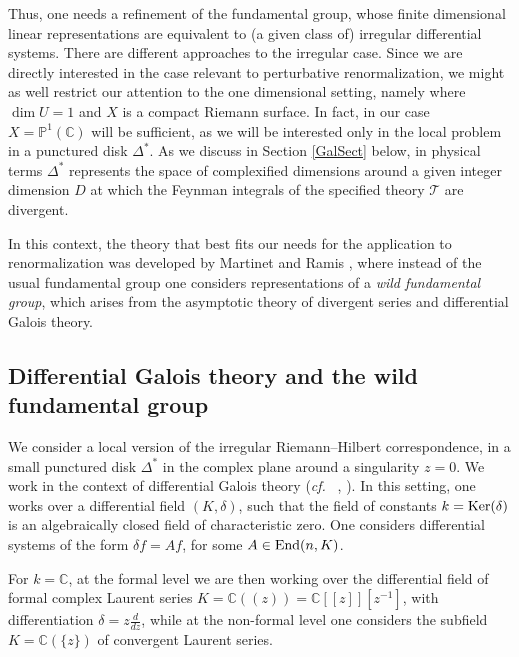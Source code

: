 \documentclass[10pt]{amsart}
\def\C{{\mathbb C}}
\renewcommand{\P}{{\mathbb P}}
\def\sT{{\mathcal T}}
\def\Ker{\mathop{\rm Ker}\nolimits}
\newcommand{\cf}{{\it cf.\/}\ }
\numberwithin{equation}{section}
\begin{document}
\smallskip

Thus, one needs a refinement of the fundamental group, whose
finite dimensional linear representations are equivalent to (a given
class of) irregular differential systems. There are different
approaches to the irregular case. Since we are directly interested in
the case relevant to perturbative renormalization, we might as well
restrict our attention to the one dimensional setting, namely where
$\dim U=1$ and $X$ is a compact Riemann surface. In fact, in our case
$X=\P^1(\C)$ will be sufficient, as we will be interested only in the
local problem in a punctured disk $\Delta^*$. As we discuss in
Section \ref{GalSect} below, in physical terms
$\Delta^*$ represents the space of complexified dimensions around a given
integer dimension $D$ at which the Feynman integrals of the specified
theory $\sT$ are divergent.

\smallskip

In this context, the theory that best fits our needs for the application
to renormalization was developed by Martinet and Ramis \cite{MR}, where
instead of the usual fundamental group one considers representations
of a {\em wild fundamental group}, which
arises from the asymptotic theory of divergent series and differential
Galois theory.

\medskip
\subsection*{Differential Galois theory and the wild fundamental
group}\label{DiffGalSect}\hfill\medskip

We consider a local version of the irregular Riemann--Hilbert
correspondence, in a small punctured
disk $\Delta^*$ in the complex plane around a singularity $z=0$.
We work in the context of differential Galois theory (\cf
\cite{vPS}, \cite{vP}). In this setting, one
works over a differential field $(K,\delta)$, such that the field of
constants $k=\Ker(\delta)$ is an algebraically closed field of
characteristic zero. One considers differential systems of the form
$\delta f = Af$, for some $A\in {\rm End}(n, K)$.

\smallskip

For $k=\C$, at the formal level we are then working over the
differential field of formal complex Laurent series
$K=\C((z))=\C[[z]][z^{-1}]$, with
differentiation $\delta=z\frac{d}{dz}$, while at the non-formal level
one considers the subfield $K=\C(\{z\})$ of convergent Laurent series.
\end{document}
